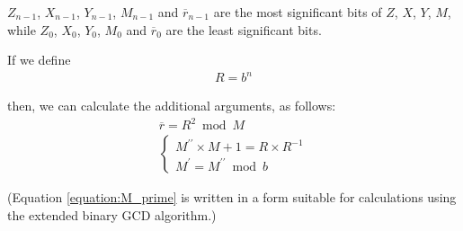 \documentclass[main\_\_EN.tex]{subfiles}
\begin{document}
\begin{math}Z_{n-1}\end{math},
\begin{math}X_{n-1}\end{math},
\begin{math}Y_{n-1}\end{math},
\begin{math}M_{n-1}\end{math} and
\begin{math}\overline{r}_{n-1}\end{math} are the most significant bits of
\begin{math}Z\end{math},
\begin{math}X\end{math},
\begin{math}Y\end{math},
\begin{math}M\end{math}, while
\begin{math}Z_{0}\end{math},
\begin{math}X_{0}\end{math},
\begin{math}Y_{0}\end{math},
\begin{math}M_{0}\end{math} and
\begin{math}\overline{r}_{0}\end{math} are the least significant bits.

If we define
\begin{gather*}
    R = b^{n}
\end{gather*}

then, we can calculate the additional arguments, as follows:
\begin{gather}
    \overline{r} = R^{2} \bmod M \label{equation:r_bar} \\
    \begin{cases}
        \displaystyle M^{\prime\prime} \times M + 1 = R \times R^{-1} \\
        \displaystyle M^{\prime} = M^{\prime\prime} \bmod b
    \end{cases} \label{equation:M_prime}
\end{gather}


(Equation \ref{equation:M_prime} is written in a form suitable for calculations using the extended binary GCD algorithm.)
\end{document}
